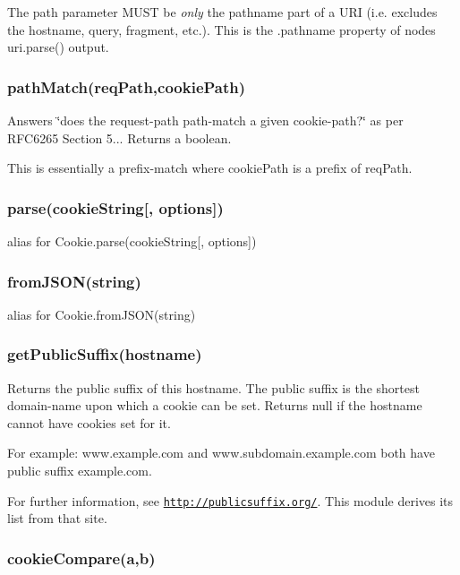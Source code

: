 The {\ttfamily path} parameter M\+U\+S\+T be {\itshape only} the pathname part of a U\+R\+I (i.\+e. excludes the hostname, query, fragment, etc.). This is the {\ttfamily .pathname} property of node\textquotesingle{}s {\ttfamily uri.\+parse()} output.

\subsubsection*{{\ttfamily path\+Match(req\+Path,cookie\+Path)}}

Answers \char`\"{}does the request-\/path path-\/match a given cookie-\/path?\char`\"{} as per R\+F\+C6265 Section 5... Returns a boolean.

This is essentially a prefix-\/match where {\ttfamily cookie\+Path} is a prefix of {\ttfamily req\+Path}.

\subsubsection*{{\ttfamily parse(cookie\+String\mbox{[}, options\mbox{]})}}

alias for {\ttfamily Cookie.\+parse(cookie\+String\mbox{[}, options\mbox{]})}

\subsubsection*{{\ttfamily from\+J\+S\+O\+N(string)}}

alias for {\ttfamily Cookie.\+from\+J\+S\+O\+N(string)}

\subsubsection*{{\ttfamily get\+Public\+Suffix(hostname)}}

Returns the public suffix of this hostname. The public suffix is the shortest domain-\/name upon which a cookie can be set. Returns {\ttfamily null} if the hostname cannot have cookies set for it.

For example\+: {\ttfamily www.\+example.\+com} and {\ttfamily www.\+subdomain.\+example.\+com} both have public suffix {\ttfamily example.\+com}.

For further information, see \href{http://publicsuffix.org/}{\tt http\+://publicsuffix.\+org/}. This module derives its list from that site.

\subsubsection*{{\ttfamily cookie\+Compare(a,b)}}

